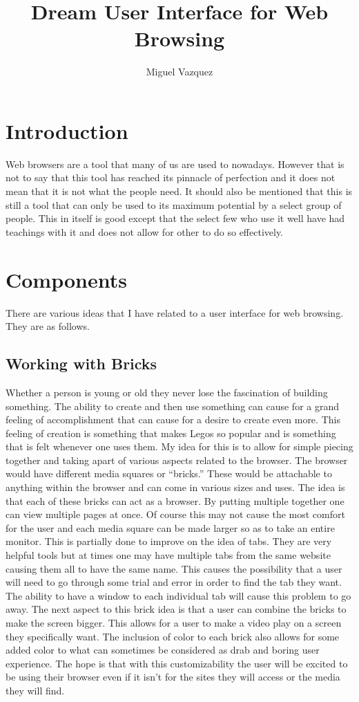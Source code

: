 \documentclass[11pt]{article}
\title{Dream User Interface for Web Browsing}
\author{Miguel Vazquez}
\begin{document}
\maketitle
\tableofcontents

\section{Introduction}
Web browsers are a tool that many of us are used to nowadays. However that is not to say that this tool has reached its pinnacle of perfection and it does not mean that it is not what the people need. It should also be mentioned that this is still a tool that can only be used to its maximum potential by a select group of people. This in itself is good except that the select few who use it well have had teachings with it and does not allow for other to do so effectively. 

\section{Components}
There are various ideas that I have related to a user interface for web browsing. They are as follows.

\subsection{Working with Bricks}
Whether a person is young or old they never lose the fascination of building something. The ability to create and then use something can cause for a grand feeling of accomplishment that can cause for a desire to create even more. This feeling of creation is something that makes Legos so popular and is something that is felt whenever one uses them. My idea for this is to allow for simple piecing together and taking apart of various aspects related to the browser. The browser would have different media squares or “bricks.” These would be attachable to anything within the browser and can come in various sizes and uses. The idea is that each of these bricks can act as a browser. By putting multiple together one can view multiple pages at once. Of course this may not cause the most comfort for the user and each media square can be made larger so as to take an entire monitor. This is partially done to improve on the idea of tabs. They are very helpful tools but at times one may have multiple tabs from the same website causing them all to have the same name. This causes the possibility that a user will need to go through some trial and error in order to find the tab they want. The ability to have a window to each individual tab will cause this problem to go away. The next aspect to this brick idea is that a user can combine the bricks to make the screen bigger. This allows for a user to make a video play on a screen they specifically want. The inclusion of color to each brick also allows for some added color to what can sometimes be considered as drab and boring user experience. The hope is that with this customizability the user will be excited to be using their browser even if it isn’t for the sites they will access or the media they will find.
\end{document}
